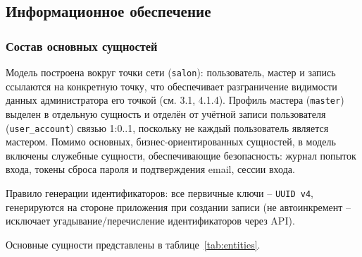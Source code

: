\subsection{Информационное обеспечение}

\subsubsection{Состав основных сущностей}

Модель построена вокруг точки сети (\texttt{salon}): пользователь, мастер и запись ссылаются на конкретную точку, что обеспечивает разграничение видимости данных администратора его точкой (см. 3.1, 4.1.4). Профиль мастера (\texttt{master}) выделен в отдельную сущность и отделён от учётной записи пользователя (\texttt{user_account}) связью 1:0..1, поскольку не каждый пользователь является мастером. Помимо основных, бизнес-ориентированных сущностей, в модель включены служебные сущности, обеспечивающие безопасность: журнал попыток входа, токены сброса пароля и подтверждения email, сессии входа.

Правило генерации идентификаторов: все первичные ключи -- \texttt{UUID v4}, генерируются на стороне приложения при создании записи (не автоинкремент -- исключает угадывание/перечисление идентификаторов через API).

Основные сущности представлены в таблице~\ref{tab:entities}.

